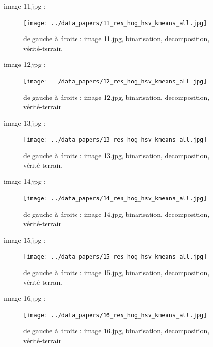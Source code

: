 \documentclass{book}
\begin{document}
image 11.jpg : 
\begin{figure}[H]
\begin{center}
\texttt{[image: ../data\_papers/11\_res\_hog\_hsv\_kmeans\_all.jpg]}
\end{center}
\caption{de gauche à droite : image 11.jpg, binarisation, decomposition, vérité-terrain}
\label{11}
\end{figure}
\clearpage


image 12.jpg : 
\begin{figure}[H]
\begin{center}
\texttt{[image: ../data\_papers/12\_res\_hog\_hsv\_kmeans\_all.jpg]}
\end{center}
\caption{de gauche à droite : image 12.jpg, binarisation, decomposition, vérité-terrain}
\label{12}
\end{figure}
\clearpage


image 13.jpg : 
\begin{figure}[H]
\begin{center}
\texttt{[image: ../data\_papers/13\_res\_hog\_hsv\_kmeans\_all.jpg]}
\end{center}
\caption{de gauche à droite : image 13.jpg, binarisation, decomposition, vérité-terrain}
\label{13}
\end{figure}
\clearpage


image 14.jpg : 
\begin{figure}[H]
\begin{center}
\texttt{[image: ../data\_papers/14\_res\_hog\_hsv\_kmeans\_all.jpg]}
\end{center}
\caption{de gauche à droite : image 14.jpg, binarisation, decomposition, vérité-terrain}
\label{14}
\end{figure}
\clearpage


image 15.jpg : 
\begin{figure}[H]
\begin{center}
\texttt{[image: ../data\_papers/15\_res\_hog\_hsv\_kmeans\_all.jpg]}
\end{center}
\caption{de gauche à droite : image 15.jpg, binarisation, decomposition, vérité-terrain}
\label{15}
\end{figure}
\clearpage


image 16.jpg : 
\begin{figure}[H]
\begin{center}
\texttt{[image: ../data\_papers/16\_res\_hog\_hsv\_kmeans\_all.jpg]}
\end{center}
\caption{de gauche à droite : image 16.jpg, binarisation, decomposition, vérité-terrain}
\label{16}
\end{figure}
\clearpage
\end{document}

